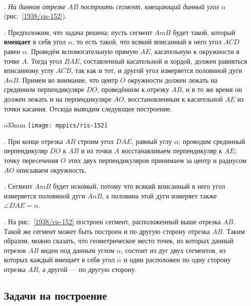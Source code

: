 \paragraph{}\label{1938/132}
\mbox{.}
\emph{На данном отрезке $AB$ построить сегмент, вмещающий данный угол $\alpha$} (рис.~\ref{1938/ris-152}).

\smallskip
\mbox{.}
Предположим, что задача решена;
пусть сегмент $AmB$ будет такой, который \textbf{вмещает} в себя угол $\alpha$, то есть такой, что всякий вписанный в него угол $ACD$ равен $\alpha$.
Проведём вспомогательную прямую $AE$, касательную к окружности в точке $A$.
Тогда угол $BAE$, составленный касательной и хордой, должен равняться вписанному углу $ACB$, так как и тот, и другой угол измеряется половиной дуги $AnB$.
Примем во внимание, что центр $O$ окружности должен лежать на срединном перпендикуляре $DO$, проведённом к отрезку $AB$, и в то же время он должен лежать и на перпендикуляре $AO$, восстановленным к касательной $AE$ из точки касания.
Отсюда выводим следующее построение.

\begin{wrapfigure}{o}{33mm}
\centering
\texttt{[image: mppics/ris-152]}
\caption{}\label{1938/ris-152}
\end{wrapfigure}

\smallskip
\mbox{.}
При конце отрезка $AB$ строим угол $DAE$, равный углу $\alpha$;
проводим срединный перпендикуляр $DO$ к $AB$ и из точки $A$ восстанавливаем перпендикуляр к $AE$; 
точку пересечения $O$ этих двух перпендикуляров принимаем за центр и радиусом $AO$ описываем окружность.

\smallskip
\mbox{.}
Сегмент $AmB$ будет искомый, потому что всякий вписанный в него угол измеряется половиной дуги $AnB$, а половина этой дуги измеряет также $\angle DAE=\alpha$.

\smallskip
\mbox{.}
На рис.~\ref{1938/ris-152} построен сегмент, расположенный выше отрезка $AB$.
Такой же сегмент может быть построен и по другую сторону отрезка $AB$.
Таким образом, можно сказать, что геометрическое место точек, из которых данный отрезок $AB$ виден под данным углом $\alpha$, состоит из дуг двух сегментов, из которых каждый вмещает в себя угол $\alpha$ и один расположен по одну сторону отрезка $AB$, а другой — по другую сторону.

\subsection*{Задачи на построение}


